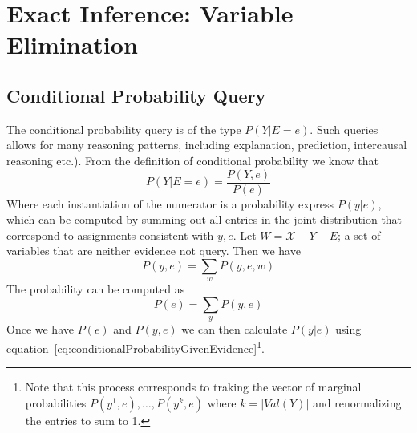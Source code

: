 \section{Exact Inference: Variable Elimination}\label{sec:exactInferenceVariableElimination}

\subsection{Conditional Probability Query}\label{sec:conditionalProbabilityQuery}
The conditional probability query is of the type $P(Y | E=e)$.  Such queries allows for many reasoning patterns, including explanation, prediction, intercausal reasoning etc.).  From the definition of conditional probability we know that
\begin{equation}\label{eq:conditionalProbabilityGivenEvidence}P(Y|E=e) = \frac{P(Y,e)}{P(e)}\end{equation}
Where each instantiation of the numerator is a probability express $P(y|e)$, which can be computed by summing out all entries in the joint distribution that correspond to assignments consistent with $y,e$.  Let $W = \mathcal{X} - Y - E$; a set of variables that are neither evidence not query.  Then we have
\begin{equation}P(y,e)=\sum_w P(y,e,w)\end{equation}
The probability can be computed as \begin{equation}P(e)=\sum_y P(y,e)\end{equation}
Once we have $P(e)$ and $P(y,e)$ we can then calculate $P(y|e)$ using equation~\ref{eq:conditionalProbabilityGivenEvidence}\footnote{Note that this process corresponds to traking the vector of marginal probabilities $P(y^1,e),\ldots,P(y^k,e)$ where $k=|Val(Y)|$ and renormalizing the entries to sum to 1. }.



